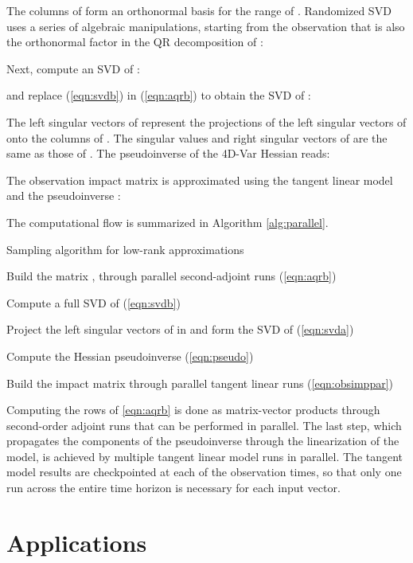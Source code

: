 \documentclass[final,sort&compress]{elsarticle}
\begin{document}
The columns of  form an orthonormal basis for the range of .
Randomized SVD uses a series of algebraic manipulations, starting from the observation that  is also the
orthonormal factor in the QR decomposition of :

Next, compute an SVD of :

and replace (\ref{eqn:svdb}) in (\ref{eqn:aqrb}) to obtain the SVD of :


The left singular vectors of  represent the projections of the left singular vectors of  onto the columns of . 
The singular values and right singular vectors of  are the same as those of . 
The pseudoinverse of the 4D-Var Hessian  reads:


The observation impact matrix is approximated using the tangent linear model  and the pseudoinverse :

The computational flow is summarized in Algorithm \ref{alg:parallel}.

\begin{algorithm}[h]
\caption{Sampling algorithm for low-rank approximations\label{alg:parallel}}
\begin{algorithmic}[1]
\item Build the matrix , through parallel second-adjoint runs (\ref{eqn:aqrb})
\item Compute a full SVD of   (\ref{eqn:svdb})
\item Project the left singular vectors of  in  and form the SVD of   (\ref{eqn:svda})
\item Compute the Hessian pseudoinverse  (\ref{eqn:pseudo})
\item Build the impact matrix  through parallel tangent linear runs (\ref{eqn:obsimppar})
\end{algorithmic}
\end{algorithm}

Computing the rows of  \eqref{eqn:aqrb} is done as matrix-vector products through second-order adjoint runs that can be performed in parallel.
The last step, which propagates the components of the pseudoinverse through the linearization of the model,
is achieved by multiple tangent linear model runs in parallel. 
The tangent model results are checkpointed at each of the observation times,
so that only one run across the entire time horizon is necessary for each input vector.

\section{Applications}\label{sec:results}
\end{document}
